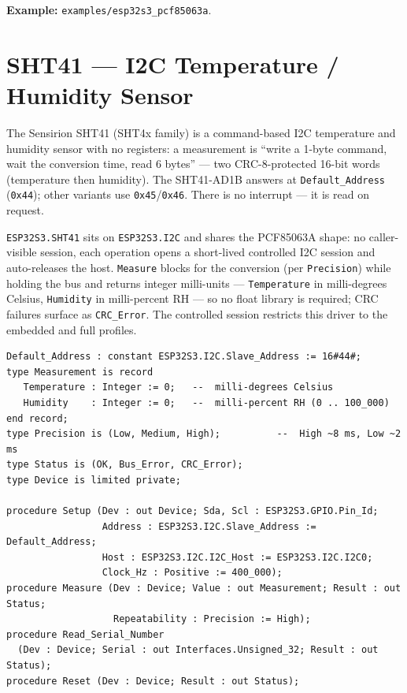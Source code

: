 \noindent\textbf{Example:} \texttt{examples/esp32s3\_pcf85063a}.

\section{SHT41 --- I2C Temperature / Humidity Sensor}
\label{app:ext:sht41}

The Sensirion SHT41 (SHT4x family) is a command-based I2C temperature and humidity
sensor with no registers: a measurement is ``write a 1-byte command, wait the
conversion time, read 6 bytes'' --- two CRC-8-protected 16-bit words (temperature
then humidity). The SHT41-AD1B answers at \texttt{Default\_Address} (\texttt{0x44});
other variants use \texttt{0x45}/\texttt{0x46}. There is no interrupt --- it is read
on request.

\texttt{ESP32S3.SHT41} sits on \texttt{ESP32S3.I2C} and shares the PCF85063A shape:
no caller-visible session, each operation opens a short-lived controlled I2C
session and auto-releases the host. \texttt{Measure} blocks for the conversion (per
\texttt{Precision}) while holding the bus and returns integer milli-units ---
\texttt{Temperature} in milli-degrees Celsius, \texttt{Humidity} in milli-percent
RH --- so no float library is required; CRC failures surface as \texttt{CRC\_Error}.
The controlled session restricts this driver to the embedded and full profiles.

\begin{lstlisting}
Default_Address : constant ESP32S3.I2C.Slave_Address := 16#44#;
type Measurement is record
   Temperature : Integer := 0;   --  milli-degrees Celsius
   Humidity    : Integer := 0;   --  milli-percent RH (0 .. 100_000)
end record;
type Precision is (Low, Medium, High);          --  High ~8 ms, Low ~2 ms
type Status is (OK, Bus_Error, CRC_Error);
type Device is limited private;

procedure Setup (Dev : out Device; Sda, Scl : ESP32S3.GPIO.Pin_Id;
                 Address : ESP32S3.I2C.Slave_Address := Default_Address;
                 Host : ESP32S3.I2C.I2C_Host := ESP32S3.I2C.I2C0;
                 Clock_Hz : Positive := 400_000);
procedure Measure (Dev : Device; Value : out Measurement; Result : out Status;
                   Repeatability : Precision := High);
procedure Read_Serial_Number
  (Dev : Device; Serial : out Interfaces.Unsigned_32; Result : out Status);
procedure Reset (Dev : Device; Result : out Status);
\end{lstlisting}

